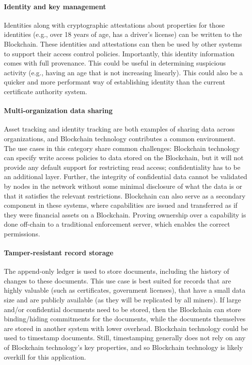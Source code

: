 \paragraph{Identity and key management}

Identities along with cryptographic attestations about properties for those identities (e.g., over 18 years of age, has a driver's license) can be written to the Blockchain.
These identities and attestations can then be used by other systems to support their access control policies.
Importantly, this identity information comes with full provenance. This could be useful in determining suspicious activity (e.g., having an age that is not increasing linearly).
This could also be a quicker and more performant way of establishing identity than the current certificate authority system.

\paragraph{Multi-organization data sharing}

Asset tracking and identity tracking are both examples of sharing data across organizations, and Blockchain technology contributes a common environment.
The use cases in this category share common challenges: Blockchain technology can specify write access policies to data stored on the Blockchain, but it will not provide any default support for restricting read access; confidentiality has to be an additional layer.
Further, the integrity of confidential data cannot be validated by nodes in the network without some minimal disclosure of what the data is or that it satisfies the relevant restrictions.
Blockchain can also serve as a secondary component in these systems, where capabilities are issued and transferred as if they were financial assets on a Blockchain. Proving ownership over a capability is done off-chain to a traditional enforcement server, which enables the correct permissions.


\paragraph{Tamper-resistant record storage}
The append-only ledger is used to store documents, including the history of changes to these documents.
This use case is best suited for records that are highly valuable (such as certificates, government licenses), that have a small data size and are publicly available (as they will be replicated by all miners).
If large and/or confidential documents need to be stored, then the Blockchain can store binding/hiding commitments for the documents, while the documents themselves are stored in another system with lower overhead.
Blockchain technology could be used to timestamp documents. Still, timestamping generally does not rely on any of Blockchain technology's key properties, and so Blockchain technology is likely overkill for this application.


